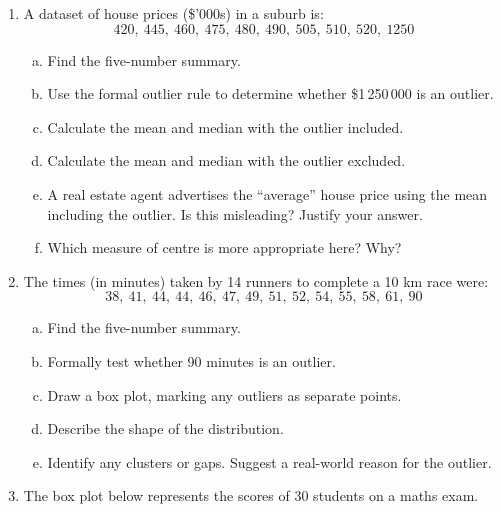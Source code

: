 \documentclass{article}
\begin{document}
\begin{enumerate}
  \item A dataset of house prices (\$'000s) in a suburb is:
  \[
    420,\ 445,\ 460,\ 475,\ 480,\ 490,\ 505,\ 510,\ 520,\ 1250
  \]
  \begin{enumerate}[(a)]
    \item Find the five-number summary.
    \item Use the formal outlier rule to determine whether \$1\,250\,000 is an outlier.
    \item Calculate the mean and median with the outlier included.
    \item Calculate the mean and median with the outlier excluded.
    \item A real estate agent advertises the ``average'' house price using the mean including the
    outlier. Is this misleading? Justify your answer.
    \item Which measure of centre is more appropriate here? Why?
  \end{enumerate}

  \item The times (in minutes) taken by 14 runners to complete a 10 km race were:
  \[
    38,\ 41,\ 44,\ 44,\ 46,\ 47,\ 49,\ 51,\ 52,\ 54,\ 55,\ 58,\ 61,\ 90
  \]
  \begin{enumerate}[(a)]
    \item Find the five-number summary.
    \item Formally test whether 90 minutes is an outlier.
    \item Draw a box plot, marking any outliers as separate points.
    \item Describe the shape of the distribution.
    \item Identify any clusters or gaps. Suggest a real-world reason for the outlier.
  \end{enumerate}

  \item The box plot below represents the scores of 30 students on a maths exam.
  \begin{center}
\end{center}
\end{enumerate}
\end{document}
